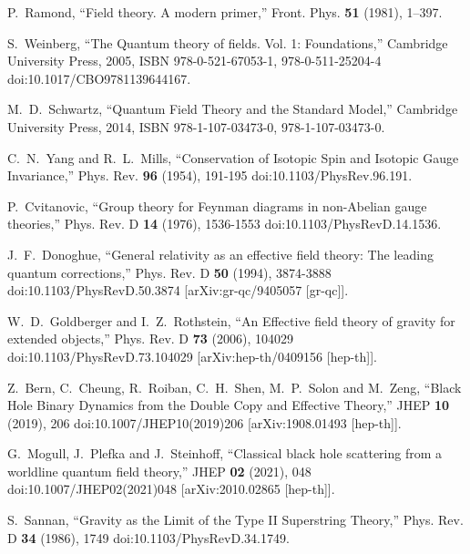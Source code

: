 P.~Ramond,
``Field theory. A modern primer,''
Front. Phys. \textbf{51} (1981), 1--397.

S.~Weinberg,
``The Quantum theory of fields. Vol. 1: Foundations,''
Cambridge University Press, 2005,
ISBN 978-0-521-67053-1, 978-0-511-25204-4
doi:10.1017/CBO9781139644167.

M.~D.~Schwartz,
``Quantum Field Theory and the Standard Model,''
Cambridge University Press, 2014,
ISBN 978-1-107-03473-0, 978-1-107-03473-0.

C.~N.~Yang and R.~L.~Mills,
``Conservation of Isotopic Spin and Isotopic Gauge Invariance,''
Phys. Rev. \textbf{96} (1954), 191-195
doi:10.1103/PhysRev.96.191.

P.~Cvitanovic,
``Group theory for Feynman diagrams in non-Abelian gauge theories,''
Phys. Rev. D \textbf{14} (1976), 1536-1553
doi:10.1103/PhysRevD.14.1536.

J.~F.~Donoghue,
``General relativity as an effective field theory: The leading quantum corrections,''
Phys. Rev. D \textbf{50} (1994), 3874-3888
doi:10.1103/PhysRevD.50.3874
[arXiv:gr-qc/9405057 [gr-qc]].

W.~D.~Goldberger and I.~Z.~Rothstein,
``An Effective field theory of gravity for extended objects,''
Phys. Rev. D \textbf{73} (2006), 104029
doi:10.1103/PhysRevD.73.104029
[arXiv:hep-th/0409156 [hep-th]].

Z.~Bern, C.~Cheung, R.~Roiban, C.~H.~Shen, M.~P.~Solon and M.~Zeng,
``Black Hole Binary Dynamics from the Double Copy and Effective Theory,''
JHEP \textbf{10} (2019), 206
doi:10.1007/JHEP10(2019)206
[arXiv:1908.01493 [hep-th]].

G.~Mogull, J.~Plefka and J.~Steinhoff,
``Classical black hole scattering from a worldline quantum field theory,''
JHEP \textbf{02} (2021), 048
doi:10.1007/JHEP02(2021)048
[arXiv:2010.02865 [hep-th]].

S.~Sannan,
``Gravity as the Limit of the Type {II} Superstring Theory,''
Phys. Rev. D \textbf{34} (1986), 1749
doi:10.1103/PhysRevD.34.1749.

